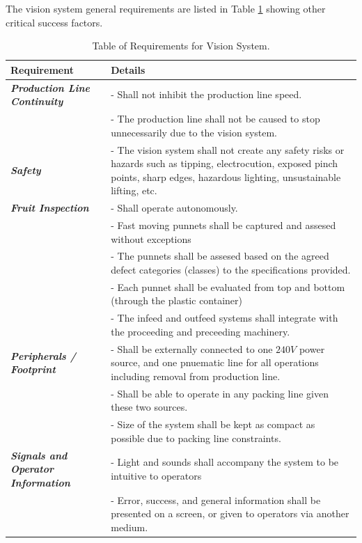 \documentclass[fleqn,twoside]{article}
\begin{document}
The vision system general requirements are listed in Table \ref{tab:requirements} showing other critical success factors.



\begin{table}[t!]
	\caption{Table of Requirements for Vision System.}
	\label{tab:requirements}
	\begin{tabular*}{\textwidth}{p{3cm}p{13cm}}
		\toprule
		\textbf{Requirement} & \textbf{Details} \\[8pt]
		\midrule
		\textbf{\textit{Production Line Continuity}} 	& - Shall not inhibit the production line speed. \\
							& - The production line shall not be caused to stop unnecessarily due to the vision system.\\
		\midrule
		\textbf{\textit{Safety}}    & - The vision system shall not create any safety risks or hazards such as tipping, electrocution, exposed pinch points, sharp edges, hazardous lighting, unsustainable lifting, etc.  \\[6pt]
		\midrule
		\textbf{\textit{Fruit Inspection}} 	& - Shall operate autonomously.\\
							& - Fast moving punnets shall be captured and assesed without exceptions \\
							& - The punnets shall be assesed based on the agreed defect categories (classes) to the specifications provided. \\
							& - Each punnet shall be evaluated from top and bottom (through the plastic container) \\
							& - The infeed and outfeed systems shall integrate with the proceeding and preceeding machinery. \\
		\midrule
		\textbf{\textit{Peripherals / Footprint}}	& - Shall be externally connected to one $240V$ power source, and one pnuematic line for all operations including removal from production line.  \\
		& - Shall be able to operate in any packing line given these two sources. \\
		& - Size of the system shall be kept as compact as possible due to packing line constraints. \\
		\midrule
		\textbf{\textit{Signals and Operator Information}}	& - Light and sounds shall accompany the system to be intuitive to operators \\
							& - Error, success, and general information shall be presented on a screen, or given to operators via another medium.  \\

\end{tabular*}
\end{table}
\end{document}
